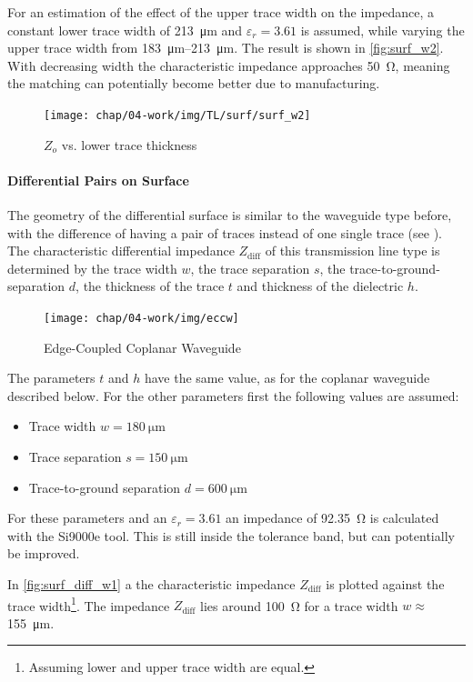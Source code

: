 For an estimation of the effect of the upper trace width on the impedance, a constant lower trace width of \SI{213}{\micro \meter} and $\varepsilon_r = 3.61$ is assumed, while varying the upper trace width from \SIrange{183}{213}{\micro \meter}.
The result is shown in \autoref{fig:surf_w2}.
With decreasing width the characteristic impedance approaches \SI{50}{\ohm}, meaning the matching can potentially become better due to manufacturing.
\begin{figure}[tbh]
	\centering
	\texttt{[image: chap/04-work/img/TL/surf/surf\_w2]}
	\caption{$Z_o$ vs. lower trace thickness}
	\label{fig:surf_w2}
\end{figure}


\paragraph{Differential Pairs on Surface}
The geometry of the differential surface is similar to the waveguide type before, with the difference of having a pair of traces instead of one single trace (see ).
The characteristic differential impedance $Z_\text{diff}$ of this transmission line type is determined by the trace width $w$, the trace separation $s$, the trace-to-ground-separation $d$, the thickness of the trace $t$ and thickness of the dielectric $h$.

\begin{figure}[tbh]
	\centering
	\texttt{[image: chap/04-work/img/eccw]}
	\caption{Edge-Coupled Coplanar Waveguide}
	\label{fig:eccw_geometry}
\end{figure}

The parameters $t$ and $h$ have the same value, as for the coplanar waveguide described below.
For the other parameters first the following values are assumed:
\begin{itemize}
	\item Trace width $w = \SI{180}{\micro \meter}$ 
	\item Trace separation $s = \SI{150}{\micro \meter}$
	\item Trace-to-ground separation $d = \SI{600}{\micro \meter}$
\end{itemize}
For these parameters and an $\varepsilon_r = 3.61$ an impedance of \SI{92.35}{\ohm} is calculated with the Si9000e tool.
This is still inside the tolerance band, but can potentially be improved.

In \autoref{fig:surf_diff_w1} a the characteristic impedance $Z_\text{diff}$ is plotted against the trace width\footnote{Assuming lower and upper trace width are equal.}. 
The impedance $Z_\text{diff}$ lies around \SI{100}{\ohm} for a trace width $w \approx$\SI{155}{\micro \meter}.

